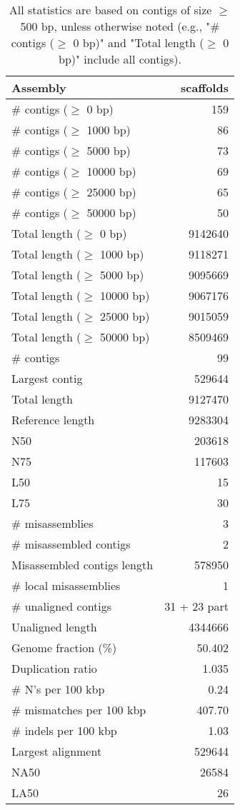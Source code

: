 \documentclass[12pt,a4paper]{article}
\begin{document}
\begin{table}[ht]
\begin{center}
\caption{All statistics are based on contigs of size $\geq$ 500 bp, unless otherwise noted (e.g., "\# contigs ($\geq$ 0 bp)" and "Total length ($\geq$ 0 bp)" include all contigs).}
\begin{tabular}{|l*{1}{|r}|}
\hline
Assembly & scaffolds \\ \hline
\# contigs ($\geq$ 0 bp) & 159 \\ \hline
\# contigs ($\geq$ 1000 bp) & 86 \\ \hline
\# contigs ($\geq$ 5000 bp) & 73 \\ \hline
\# contigs ($\geq$ 10000 bp) & 69 \\ \hline
\# contigs ($\geq$ 25000 bp) & 65 \\ \hline
\# contigs ($\geq$ 50000 bp) & 50 \\ \hline
Total length ($\geq$ 0 bp) & 9142640 \\ \hline
Total length ($\geq$ 1000 bp) & 9118271 \\ \hline
Total length ($\geq$ 5000 bp) & 9095669 \\ \hline
Total length ($\geq$ 10000 bp) & 9067176 \\ \hline
Total length ($\geq$ 25000 bp) & 9015059 \\ \hline
Total length ($\geq$ 50000 bp) & 8509469 \\ \hline
\# contigs & 99 \\ \hline
Largest contig & 529644 \\ \hline
Total length & 9127470 \\ \hline
Reference length & 9283304 \\ \hline
N50 & 203618 \\ \hline
N75 & 117603 \\ \hline
L50 & 15 \\ \hline
L75 & 30 \\ \hline
\# misassemblies & 3 \\ \hline
\# misassembled contigs & 2 \\ \hline
Misassembled contigs length & 578950 \\ \hline
\# local misassemblies & 1 \\ \hline
\# unaligned contigs & 31 + 23 part \\ \hline
Unaligned length & 4344666 \\ \hline
Genome fraction (\%) & 50.402 \\ \hline
Duplication ratio & 1.035 \\ \hline
\# N's per 100 kbp & 0.24 \\ \hline
\# mismatches per 100 kbp & 407.70 \\ \hline
\# indels per 100 kbp & 1.03 \\ \hline
Largest alignment & 529644 \\ \hline
NA50 & 26584 \\ \hline
LA50 & 26 \\ \hline
\end{tabular}
\end{center}
\end{table}
\end{document}

